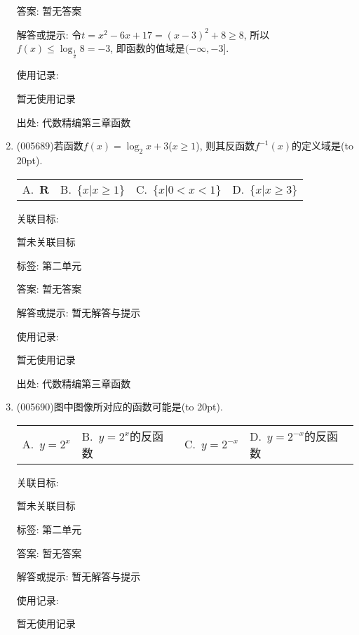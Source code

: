 \documentclass[10pt,a4paper]{article}
\newcommand{\bracket}[1]{(\hbox to #1pt{})}
\newcommand{\fourch}[4]{\par\begin{tabular}{p{.23\textwidth}p{.23\textwidth}p{.23\textwidth}p{.23\textwidth}}
A.~#1 &B.~#2& C.~#3& D.~#4
\end{tabular}}
\begin{document}
\begin{enumerate}[1.]
答案: 暂无答案

解答或提示: 令$t=x^2-6x+17=(x-3)^2+8\ge 8$,
所以$ f(x)\le \log_{\frac 12}8=-3$, 即函数的值域是$(-\infty ,-3]$.

使用记录:

暂无使用记录


出处: 代数精编第三章函数
\item { (005689)}若函数$f(x)=\log_2x+3$($x\ge 1$), 则其反函数$f^{-1}(x)$的定义域是\bracket{20}.
\fourch{$\mathbf{R}$}{$\{x|x\ge 1\}$}{$\{x|0<x<1\}$}{$\{x|x\ge 3\}$}


关联目标:

暂未关联目标



标签: 第二单元

答案: 暂无答案

解答或提示: 暂无解答与提示

使用记录:

暂无使用记录


出处: 代数精编第三章函数
\item { (005690)}图中图像所对应的函数可能是\bracket{20}.
\begin{center}
\end{center}
\fourch{$y=2^x$}{$y=2^x$的反函数}{$y=2^{-x}$}{$y=2^{-x}$的反函数}


关联目标:

暂未关联目标



标签: 第二单元

答案: 暂无答案

解答或提示: 暂无解答与提示

使用记录:

暂无使用记录



\end{enumerate}
\end{document}

